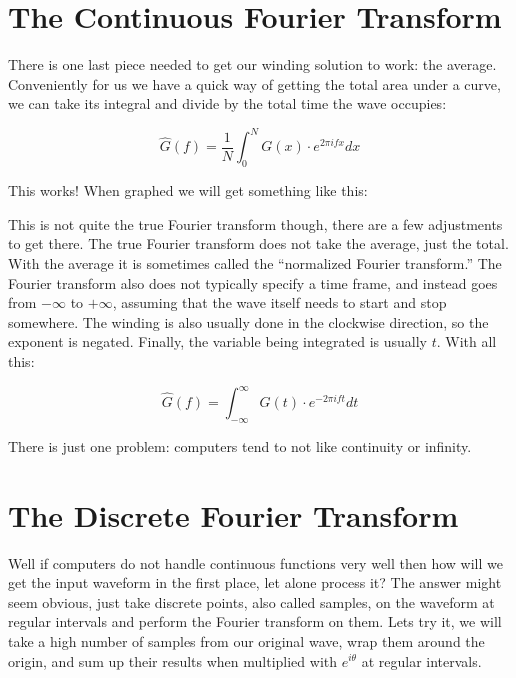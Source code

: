 \documentclass[12pt]{article}
\begin{document}
\pagebreak

\section{The Continuous Fourier Transform}

There is one last piece needed to get our winding solution to work: the average. Conveniently for us we have a quick way of getting the total area under a curve, we can take its integral and divide by the total time the wave occupies:

\begin{displaymath}
  \hat{G}(f) = \frac{1}{N}\int_{0}^{N} G(x) \cdot e^{2\pi ifx}dx
\end{displaymath}

This works! When graphed we will get something like this:


This is not quite the true Fourier transform though, there are a few adjustments to get there. The true Fourier transform does not take the average, just the total. With the average it is sometimes called the ``normalized Fourier transform.'' The Fourier transform also does not typically specify a time frame, and instead goes from $-\infty$ to $+\infty$, assuming that the wave itself needs to start and stop somewhere. The winding is also usually done in the clockwise direction, so the exponent is negated. Finally, the variable being integrated is usually $t$. With all this:

\begin{displaymath}
  \hat{G}(f) = \int_{-\infty}^{\infty} G(t) \cdot e^{-2\pi ift}dt
\end{displaymath}

There is just one problem: computers tend to not like continuity or infinity.

\pagebreak

\section{The Discrete Fourier Transform}

Well if computers do not handle continuous functions very well then how will we get the input waveform in the first place, let alone process it? The answer might seem obvious, just take discrete points, also called samples, on the waveform at regular intervals and perform the Fourier transform on them. Lets try it, we will take a high number of samples from our original wave, wrap them around the origin, and sum up their results when multiplied with $e^{i\theta}$ at regular intervals.
\end{document}
